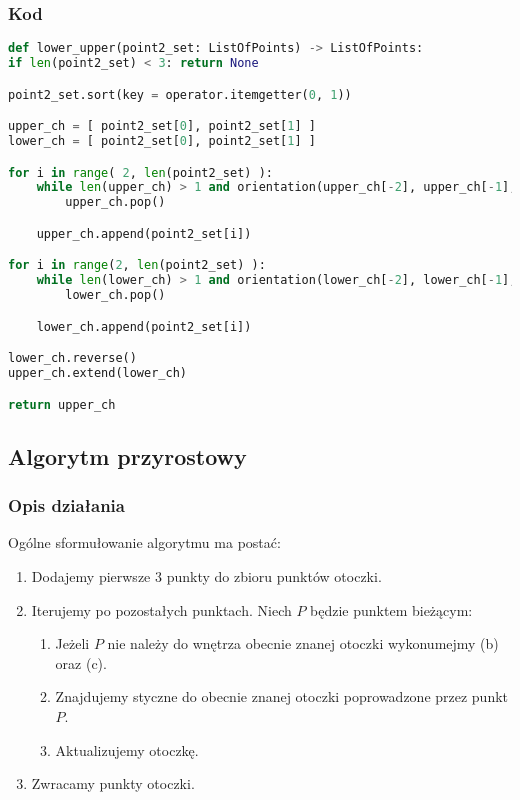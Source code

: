 \documentclass[11pt]{article}
\theoremstyle{remark} \newtheorem{definition}{def.}
\theoremstyle{definition} \newtheorem{twierdzenie}{tw.}
\begin{document}
    \subsubsection{Kod}

\begin{lstlisting}[language=Python]
def lower_upper(point2_set: ListOfPoints) -> ListOfPoints:
if len(point2_set) < 3: return None

point2_set.sort(key = operator.itemgetter(0, 1))

upper_ch = [ point2_set[0], point2_set[1] ] 
lower_ch = [ point2_set[0], point2_set[1] ]

for i in range( 2, len(point2_set) ):
    while len(upper_ch) > 1 and orientation(upper_ch[-2], upper_ch[-1], point2_set[i]) != -1:
        upper_ch.pop()

    upper_ch.append(point2_set[i])

for i in range(2, len(point2_set) ):
    while len(lower_ch) > 1 and orientation(lower_ch[-2], lower_ch[-1], point2_set[i]) != 1:
        lower_ch.pop()

    lower_ch.append(point2_set[i])

lower_ch.reverse()
upper_ch.extend(lower_ch)

return upper_ch
\end{lstlisting}



\subsection{Algorytm przyrostowy}
    \subsubsection{Opis działania}
    Ogólne sformułowanie algorytmu ma postać:
    \begin{enumerate}
        \item   Dodajemy pierwsze 3 punkty do zbioru punktów otoczki. 
        \item   Iterujemy po pozostałych punktach. Niech $P$ będzie punktem bieżącym:
                \begin{enumerate}
                    \item   Jeżeli $P$ nie należy do wnętrza obecnie znanej otoczki wykonumejmy (b) oraz (c).
                    \item   Znajdujemy styczne do obecnie znanej otoczki poprowadzone przez punkt $P$. 
                    \item   Aktualizujemy otoczkę.
                \end{enumerate}
        \item   Zwracamy punkty otoczki. 
    \end{enumerate}
\end{document}
